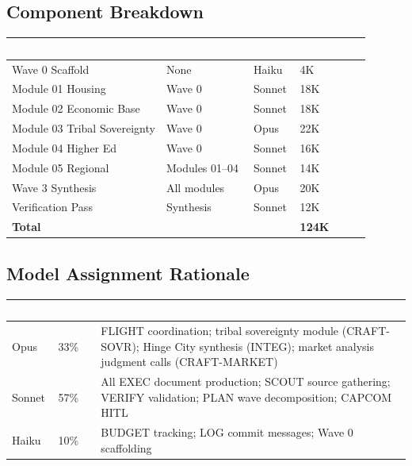 \documentclass[11pt,letterpaper]{article}
\newcommand{\tableheader}[1]{\textbf{\sffamily\textcolor{white}{#1}}}
\begin{document}
\subsection{Component Breakdown}

\begin{center}
\begin{tabularx}{\textwidth}{L{3cm}L{3cm}C{1.8cm}C{2cm}}
\toprule
{}
\tableheader{Component} & \tableheader{Dependencies} & \tableheader{Model} & \tableheader{Token Est.} \\
\midrule
Wave 0 Scaffold & None & Haiku & 4K \\
Module 01 Housing & Wave 0 & Sonnet & 18K \\
Module 02 Economic Base & Wave 0 & Sonnet & 18K \\
Module 03 Tribal Sovereignty & Wave 0 & Opus & 22K \\
Module 04 Higher Ed & Wave 0 & Sonnet & 16K \\
Module 05 Regional & Modules 01--04 & Sonnet & 14K \\
Wave 3 Synthesis & All modules & Opus & 20K \\
Verification Pass & Synthesis & Sonnet & 12K \\
\midrule
\textbf{Total} & & & \textbf{124K} \\
\bottomrule
\end{tabularx}
\end{center}

\subsection{Model Assignment Rationale}

\begin{center}
\begin{tabularx}{\textwidth}{L{2.5cm}C{2cm}X}
\toprule
{}
\tableheader{Model} & \tableheader{Share} & \tableheader{Assigned Work} \\
\midrule
Opus & 33\% & FLIGHT coordination; tribal sovereignty module (CRAFT-SOVR); Hinge City synthesis (INTEG); market analysis judgment calls (CRAFT-MARKET) \\
Sonnet & 57\% & All EXEC document production; SCOUT source gathering; VERIFY validation; PLAN wave decomposition; CAPCOM HITL \\
Haiku & 10\% & BUDGET tracking; LOG commit messages; Wave 0 scaffolding \\
\bottomrule
\end{tabularx}
\end{center}
\end{document}
